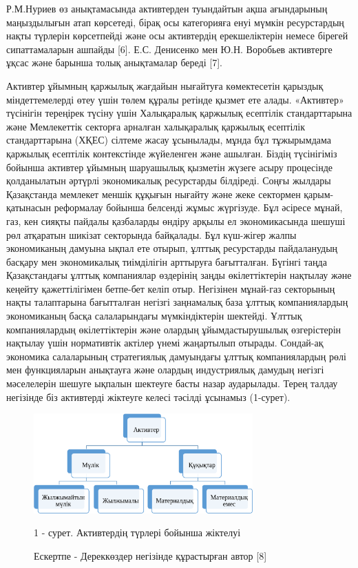 \begin{multicols}{2}
Р.М.Нуриев өз анықтамасында активтерден туындайтын ақша ағындарының
маңыздылығын атап көрсетеді, бірақ осы категорияға енуі мүмкін
ресурстардың нақты түрлерін көрсетпейді және осы активтердің
ерекшеліктерін немесе бірегей сипаттамаларын ашпайды {[}6{]}. Е.С.
Денисенко мен Ю.Н. Воробьев активтерге ұқсас және барынша толық
анықтамалар береді {[}7{]}.

Активтер ұйымның қаржылық жағдайын нығайтуға көмектесетін қарыздық
міндеттемелерді өтеу үшін төлем құралы ретінде қызмет ете алады.
«Активтер» түсінігін тереңірек түсіну үшін Халықаралық қаржылық
есептілік стандарттарына және Мемлекеттік секторға арналған халықаралық
қаржылық есептілік стандарттарына (ХҚЕС) сілтеме жасау ұсынылады, мұнда
бұл тұжырымдама қаржылық есептілік контекстінде жүйеленген және ашылған.
Біздің түсінігіміз бойынша активтер ұйымның шаруашылық қызметін жүзеге
асыру процесінде қолданылатын әртүрлі экономикалық ресурстарды
білдіреді. Соңғы жылдары Қазақстанда мемлекет меншік құқығын нығайту
және жеке сектормен қарым-қатынасын реформалау бойынша белсенді жұмыс
жүргізуде. Бұл әсіресе мұнай, газ, кен сияқты пайдалы қазбаларды өндіру
арқылы ел экономикасында шешуші рөл атқаратын шикізат секторында
байқалады. Бұл күш-жігер жалпы экономиканың дамуына ықпал ете отырып,
ұлттық ресурстарды пайдаланудың басқару мен экономикалық тиімділігін
арттыруға бағытталған. Бүгінгі таңда Қазақстандағы ұлттық компаниялар
өздерінің заңды өкілеттіктерін нақтылау және кеңейту қажеттілігімен
бетпе-бет келіп отыр. Негізінен мұнай-газ секторының нақты талаптарына
бағытталған негізгі заңнамалық база ұлттық компаниялардың экономиканың
басқа салаларындағы мүмкіндіктерін шектейді. Ұлттық компаниялардың
өкілеттіктерін және олардың ұйымдастырушылық өзгерістерін нақтылау үшін
нормативтік актілер үнемі жаңартылып отырады. Сондай-ақ экономика
салаларының стратегиялық дамуындағы ұлттық компаниялардың рөлі мен
функцияларын анықтауға және олардың индустриялық дамудың негізгі
мәселелерін шешуге ықпалын шектеуге басты назар аударылады. Терең талдау
негізінде біз активтерді жіктеуге келесі тәсілді ұсынамыз (1-сурет).
\end{multicols}

\begin{figure}[H]
	\centering
	\includegraphics[width=0.75\textwidth]{media/ekon2/image11}
	\caption*{1 - сурет. Активтердің түрлері бойынша жіктелуі}
	\caption*{Ескертпе - Дереккөздер негізінде құрастырған автор {[}8{]}}
\end{figure}

